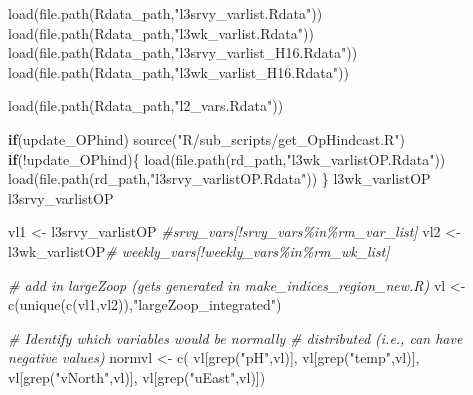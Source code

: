 \documentclass[
]{article}
\newenvironment{Shaded}{\begin{snugshade}}{\end{snugshade}}
\newcommand{\CommentTok}[1]{\textcolor[rgb]{0.56,0.35,0.01}{\textit{#1}}}
\newcommand{\ControlFlowTok}[1]{\textcolor[rgb]{0.13,0.29,0.53}{\textbf{#1}}}
\newcommand{\FunctionTok}[1]{\textcolor[rgb]{0.00,0.00,0.00}{#1}}
\newcommand{\NormalTok}[1]{#1}
\newcommand{\OtherTok}[1]{\textcolor[rgb]{0.56,0.35,0.01}{#1}}
\newcommand{\SpecialCharTok}[1]{\textcolor[rgb]{0.00,0.00,0.00}{#1}}
\newcommand{\StringTok}[1]{\textcolor[rgb]{0.31,0.60,0.02}{#1}}
\begin{document}
\begin{Shaded}
\begin{Highlighting}[]
    \FunctionTok{load}\NormalTok{(}\FunctionTok{file.path}\NormalTok{(Rdata\_path,}\StringTok{"l3srvy\_varlist.Rdata"}\NormalTok{))}
    \FunctionTok{load}\NormalTok{(}\FunctionTok{file.path}\NormalTok{(Rdata\_path,}\StringTok{"l3wk\_varlist.Rdata"}\NormalTok{))}
    \FunctionTok{load}\NormalTok{(}\FunctionTok{file.path}\NormalTok{(Rdata\_path,}\StringTok{"l3srvy\_varlist\_H16.Rdata"}\NormalTok{))}
    \FunctionTok{load}\NormalTok{(}\FunctionTok{file.path}\NormalTok{(Rdata\_path,}\StringTok{"l3wk\_varlist\_H16.Rdata"}\NormalTok{))}
    
    \FunctionTok{load}\NormalTok{(}\FunctionTok{file.path}\NormalTok{(Rdata\_path,}\StringTok{"l2\_vars.Rdata"}\NormalTok{))}
    
    
    
    \ControlFlowTok{if}\NormalTok{(update\_OPhind)}
      \FunctionTok{source}\NormalTok{(}\StringTok{"R/sub\_scripts/get\_OpHindcast.R"}\NormalTok{)}
    \ControlFlowTok{if}\NormalTok{(}\SpecialCharTok{!}\NormalTok{update\_OPhind)\{}
      \FunctionTok{load}\NormalTok{(}\FunctionTok{file.path}\NormalTok{(rd\_path,}\StringTok{"l3wk\_varlistOP.Rdata"}\NormalTok{))}
      \FunctionTok{load}\NormalTok{(}\FunctionTok{file.path}\NormalTok{(rd\_path,}\StringTok{"l3srvy\_varlistOP.Rdata"}\NormalTok{))}
\NormalTok{    \}}
\NormalTok{    l3wk\_varlistOP}
\NormalTok{    l3srvy\_varlistOP}
    
\NormalTok{    vl1   }\OtherTok{\textless{}{-}}\NormalTok{ l3srvy\_varlistOP }\CommentTok{\#srvy\_vars[!srvy\_vars\%in\%rm\_var\_list]}
\NormalTok{    vl2   }\OtherTok{\textless{}{-}}\NormalTok{ l3wk\_varlistOP}\CommentTok{\# weekly\_vars[!weekly\_vars\%in\%rm\_wk\_list]}
    
    \CommentTok{\# add in largeZoop (gets generated in make\_indices\_region\_new.R)}
\NormalTok{    vl }\OtherTok{\textless{}{-}} \FunctionTok{c}\NormalTok{(}\FunctionTok{unique}\NormalTok{(}\FunctionTok{c}\NormalTok{(vl1,vl2)),}\StringTok{"largeZoop\_integrated"}\NormalTok{)}
   
    \CommentTok{\# Identify which variables would be normally }
    \CommentTok{\# distributed (i.e., can have negative values)}
\NormalTok{     normvl }\OtherTok{\textless{}{-}} \FunctionTok{c}\NormalTok{( vl[}\FunctionTok{grep}\NormalTok{(}\StringTok{"pH"}\NormalTok{,vl)],}
\NormalTok{                  vl[}\FunctionTok{grep}\NormalTok{(}\StringTok{"temp"}\NormalTok{,vl)],}
\NormalTok{                  vl[}\FunctionTok{grep}\NormalTok{(}\StringTok{"vNorth"}\NormalTok{,vl)],}
\NormalTok{                  vl[}\FunctionTok{grep}\NormalTok{(}\StringTok{"uEast"}\NormalTok{,vl)])}


\end{Highlighting}
\end{Shaded}
\end{document}
